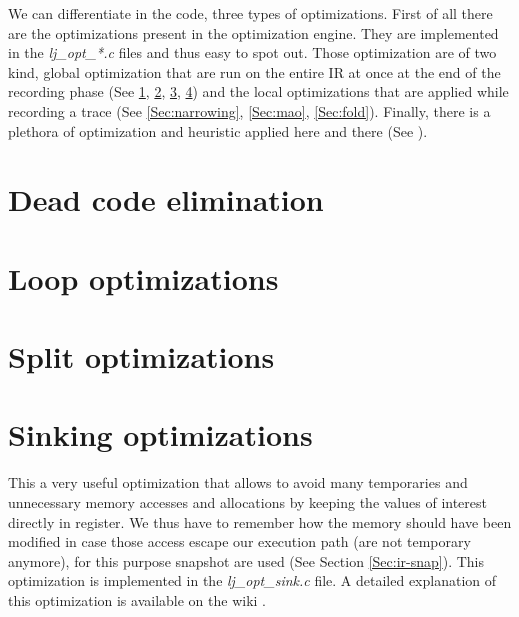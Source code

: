 
We can differentiate in the code, three types of optimizations.
First of all there are the optimizations present in the optimization engine.
They are implemented in the \emph{lj\_opt\_*.c} files and thus easy to spot out.
Those optimization are of two kind, global optimization that are run on the
entire IR at once at the end of the recording phase (See \ref{Sec:opt-dce}, \ref{Sec:opt-loop}, \ref{Sec:opt-split}, \ref{Sec:opt-sinking}) and the local
optimizations that are applied while recording a trace (See \ref{Sec:narrowing},
\ref{Sec:mao}, \ref{Sec:fold}).
Finally, there is a plethora of optimization and heuristic applied here and
there (See ).


\section{Dead code elimination}
\label{Sec:opt-dce}

\section{Loop optimizations}
\label{Sec:opt-loop}

\section{Split optimizations}
\label{Sec:opt-split}

\section{Sinking optimizations}
\label{Sec:opt-sinking}
This a very useful optimization that allows to avoid many temporaries and
unnecessary memory accesses and allocations by keeping the values of interest
directly in register. We thus have to remember how the memory should have been
modified in case those access escape our execution path (are not temporary
anymore), for this purpose snapshot are used (See Section \ref{Sec:ir-snap}). This optimization is implemented
in the \emph{lj\_opt\_sink.c} file. A detailed explanation of this optimization
is available on the wiki \cite{luajit-sink}.


